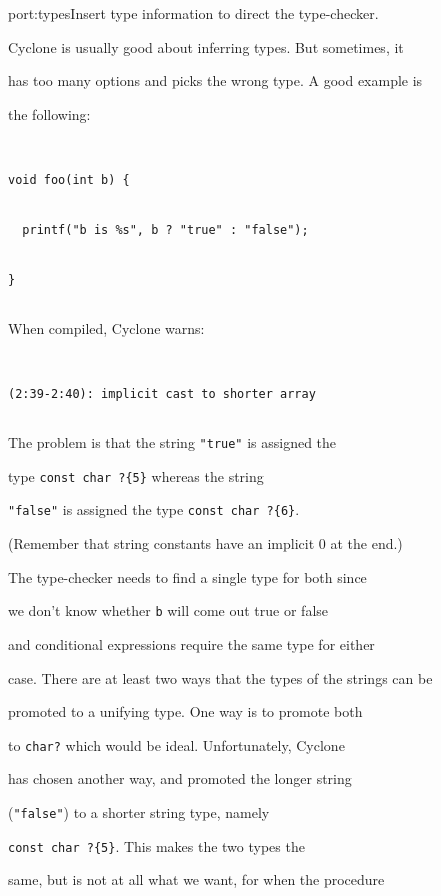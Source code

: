 \begin{porta}{port:types}{Insert type information to direct the type-checker.}





Cyclone is usually good about inferring types.  But sometimes, it


has too many options and picks the wrong type.  A good example is


the following:


\begin{verbatim}


void foo(int b) {


  printf("b is %s", b ? "true" : "false");


} 


\end{verbatim}


When compiled, Cyclone warns:


\begin{verbatim}


(2:39-2:40): implicit cast to shorter array


\end{verbatim}


The problem is that the string \texttt{"true"} is assigned the


type \texttt{const char ?\{5\}} whereas the string


\texttt{"false"} is assigned the type \texttt{const char ?\{6\}}.


(Remember that string constants have an implicit 0 at the end.)


The type-checker needs to find a single type for both since


we don't know whether \texttt{b} will come out true or false


and conditional expressions require the same type for either


case.  There are at least two ways that the types of the strings can be


promoted to a unifying type.  One way is to promote both


to \texttt{char?} which would be ideal.  Unfortunately, Cyclone


has chosen another way, and promoted the longer string


(\texttt{"false"}) to a shorter string type, namely


\texttt{const char ?\{5\}}.  This makes the two types the


same, but is not at all what we want, for when the procedure



\end{porta}
